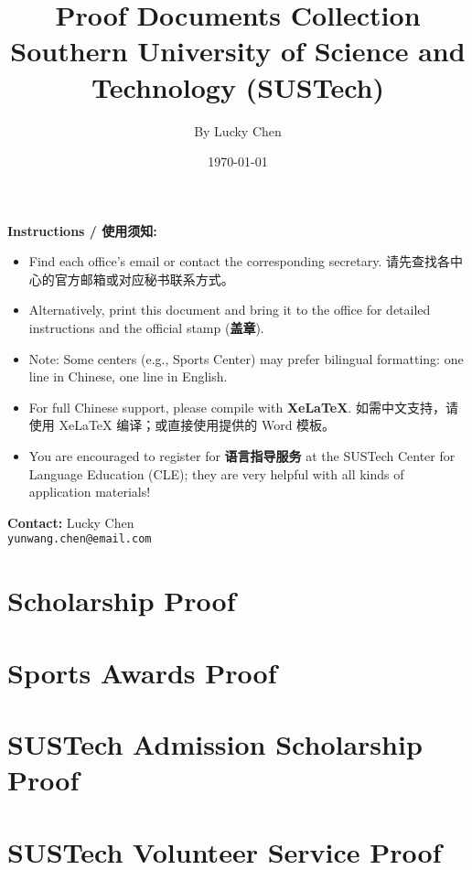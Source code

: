 \documentclass[12pt,a4paper]{article}
\title{
    \Huge \textbf{Proof Documents Collection} \\[0.5cm]
    \Large Southern University of Science and Technology (SUSTech)
}
\author{By Lucky Chen}
\date{\today}
\begin{document}
\maketitle
\thispagestyle{empty}

\vspace{1cm}

\noindent \textbf{Instructions / 使用须知:}

\begin{itemize}
    \item Find each office’s email or contact the corresponding secretary. 请先查找各中心的官方邮箱或对应秘书联系方式。
    \item Alternatively, print this document and bring it to the office for detailed instructions and the official stamp (\textbf{盖章}).
    \item Note: Some centers (e.g., Sports Center) may prefer bilingual formatting: one line in Chinese, one line in English.
    \item For full Chinese support, please compile with \textbf{XeLaTeX}. 如需中文支持，请使用 XeLaTeX 编译；或直接使用提供的 Word 模板。
    \item You are encouraged to register for \textbf{语言指导服务} at the SUSTech Center for Language Education (CLE); they are very helpful with all kinds of application materials!
\end{itemize}

\vspace{1cm}

\noindent \textbf{Contact:} Lucky Chen \\
\texttt{yunwang.chen@email.com} 

\newpage

\section{Scholarship Proof}


\section{Sports Awards Proof}


\section{SUSTech Admission Scholarship Proof}


\section{SUSTech Volunteer Service Proof}


\end{document}
